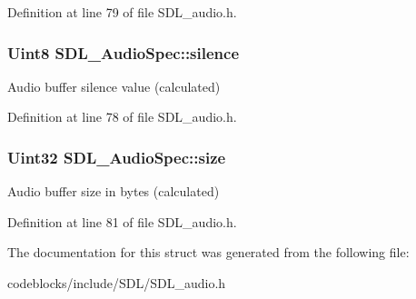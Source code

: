 Definition at line 79 of file S\+D\+L\+\_\+audio.\+h.

\hypertarget{structSDL__AudioSpec_addc462c8a806e6c122eccf63482048f6}{
\subsubsection[{silence}]{\setlength{\rightskip}{0pt plus 5cm}Uint8 S\+D\+L\+\_\+\+Audio\+Spec\+::silence}}\label{structSDL__AudioSpec_addc462c8a806e6c122eccf63482048f6}
Audio buffer silence value (calculated) 

Definition at line 78 of file S\+D\+L\+\_\+audio.\+h.

\hypertarget{structSDL__AudioSpec_a154cf44743ecec78c36dc6c827dd2fdb}{
\subsubsection[{size}]{\setlength{\rightskip}{0pt plus 5cm}Uint32 S\+D\+L\+\_\+\+Audio\+Spec\+::size}}\label{structSDL__AudioSpec_a154cf44743ecec78c36dc6c827dd2fdb}
Audio buffer size in bytes (calculated) 

Definition at line 81 of file S\+D\+L\+\_\+audio.\+h.



The documentation for this struct was generated from the following file\+:\begin{DoxyCompactItemize}
\item 
codeblocks/include/\+S\+D\+L/S\+D\+L\+\_\+audio.\+h\end{DoxyCompactItemize}
